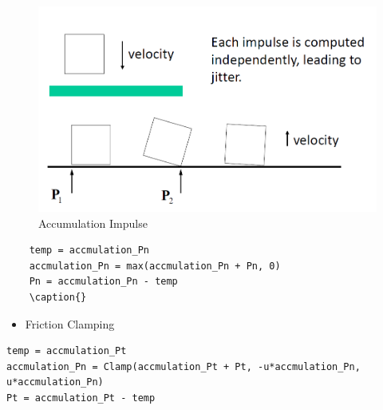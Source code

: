 \begin{figure}[h]
    \begin{center}
        \includegraphics[width=0.8\linewidth]{./resources/physics/accu.png}
    \end{center}
    \caption{Accumulation Impulse}
    \label{Accumulation_Impulse}
\end{figure}

\begin{lstlisting} 
    temp = accmulation_Pn
    accmulation_Pn = max(accmulation_Pn + Pn, 0)
    Pn = accmulation_Pn - temp
    \caption{}
\end{lstlisting}

\begin{itemize}
    \item{Friction Clamping}
\end{itemize}
           
\begin{lstlisting} 
temp = accmulation_Pt
accmulation_Pn = Clamp(accmulation_Pt + Pt, -u*accmulation_Pn, u*accmulation_Pn)
Pt = accmulation_Pt - temp
\end{lstlisting}


